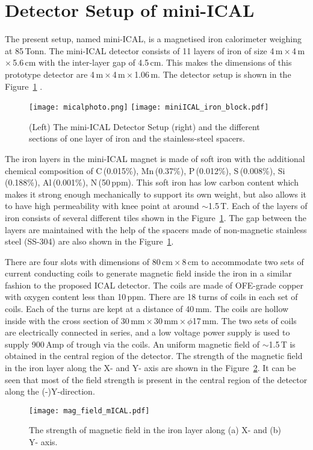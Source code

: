 \section{Detector Setup of mini-ICAL}
The present setup, named mini-ICAL, is a magnetised iron calorimeter
weighing at 85\,Tonn. The mini-ICAL detector consists of 11 layers
of iron of size 4\,m\,$\times$\,4\,m\,$\times$\,5.6\,cm with the
inter-layer gap of 4.5\,cm. This makes the dimensions of this
prototype detector are 4\,m\,$\times$\,4\,m\,$\times$\,1.06\,m.
The detector setup is shown in the Figure~\ref{fig:miniICAL_iron}
.
\begin{figure}[h]
  \centering
  \texttt{[image: micalphoto.png]}
  \texttt{[image: miniICAL\_iron\_block.pdf]}
  \caption{(Left) The mini-ICAL Detector Setup (right) and the
    different sections of one layer of iron and the stainless-steel
    spacers.}
  \label{fig:miniICAL_iron}
\end{figure}
The iron layers in the mini-ICAL magnet is made of soft iron with
the additional chemical composition of C\,(0.015\%), Mn\,(0.37\%),
P\,(0.012\%), S\,(0.008\%), Si\,(0.188\%), Al\,(0.001\%), N\,(50\,ppm). %
This soft iron has low carbon content which makes it strong enough
mechanically to support its own weight, but also allows it to have high
permeability with knee point at around $\sim$1.5\,T.
Each of the layers of iron consists of several different tiles shown
in the Figure~\ref{fig:miniICAL_iron}.
The gap between the layers are maintained with the help of the spacers
made of non-magnetic stainless steel (SS-304) are also shown in the
Figure~\ref{fig:miniICAL_iron}.

There are four slots with dimensions of 80\,cm\,$\times$\,8\,cm to
accommodate two sets of current conducting coils to generate magnetic
field inside the iron in a similar fashion to the proposed
ICAL detector. The coils are made of OFE-grade copper with
oxygen content less than 10\,ppm. There are 18 turns of coils in each
set of coils. Each of the turns are kept at a distance of 40\,mm.
The coils are hollow inside with the cross section of
30\,mm\,$\times$\,30\,mm\,$\times$\,$\phi$17\,mm.
The two sets of coils are electrically connected in series,
and a low voltage power supply is used to supply 900\,Amp
of trough via the coils. An uniform magnetic field of $\sim$1.5\,T
is obtained in the central region of the detector.
The strength of the magnetic field in the iron layer along the X- and Y-
axis are shown in the Figure~\ref{fig:magfieldmical}. It can be seen
that most of the field strength is present in the central region of the
detector along the (-)Y-direction.
\begin{figure}[h]
  \centering
  \texttt{[image: mag\_field\_mICAL.pdf]}
  \caption{The strength of magnetic field in the iron layer along (a) X-
    and (b) Y- axis.}
  \label{fig:magfieldmical}
\end{figure}

